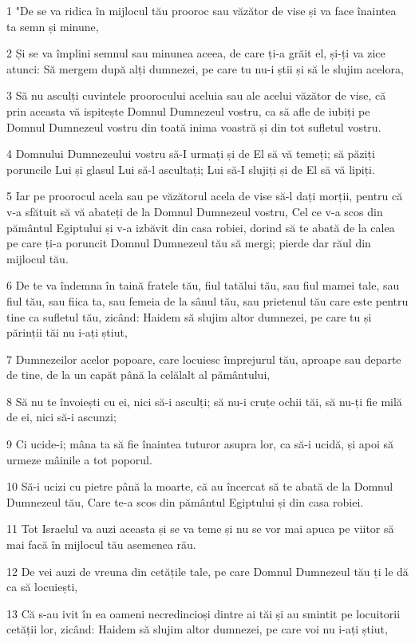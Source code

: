 \par 1 "De se va ridica în mijlocul tău prooroc sau văzător de vise și va face înaintea ta semn și minune,
\par 2 Și se va împlini semnul sau minunea aceea, de care ți-a grăit el, și-ți va zice atunci: Să mergem după alți dumnezei, pe care tu nu-i știi și să le slujim acelora,
\par 3 Să nu asculți cuvintele proorocului aceluia sau ale acelui văzător de vise, că prin aceasta vă ispitește Domnul Dumnezeul vostru, ca să afle de iubiți pe Domnul Dumnezeul vostru din toată inima voastră și din tot sufletul vostru.
\par 4 Domnului Dumnezeului vostru să-I urmați și de El să vă temeți; să păziți poruncile Lui și glasul Lui să-l ascultați; Lui să-I slujiți și de El să vă lipiți.
\par 5 Iar pe proorocul acela sau pe văzătorul acela de vise să-l dați morții, pentru că v-a sfătuit să vă abateți de la Domnul Dumnezeul vostru, Cel ce v-a scos din pământul Egiptului și v-a izbăvit din casa robiei, dorind să te abată de la calea pe care ți-a poruncit Domnul Dumnezeul tău să mergi; pierde dar răul din mijlocul tău.
\par 6 De te va îndemna în taină fratele tău, fiul tatălui tău, sau fiul mamei tale, sau fiul tău, sau fiica ta, sau femeia de la sânul tău, sau prietenul tău care este pentru tine ca sufletul tău, zicând: Haidem să slujim altor dumnezei, pe care tu și părinții tăi nu i-ați știut,
\par 7 Dumnezeilor acelor popoare, care locuiesc împrejurul tău, aproape sau departe de tine, de la un capăt până la celălalt al pământului,
\par 8 Să nu te învoiești cu ei, nici să-i asculți; să nu-i cruțe ochii tăi, să nu-ți fie milă de ei, nici să-i ascunzi;
\par 9 Ci ucide-i; mâna ta să fie înaintea tuturor asupra lor, ca să-i ucidă, și apoi să urmeze mâinile a tot poporul.
\par 10 Să-i ucizi cu pietre până la moarte, că au încercat să te abată de la Domnul Dumnezeul tău, Care te-a scos din pământul Egiptului și din casa robiei.
\par 11 Tot Israelul va auzi aceasta și se va teme și nu se vor mai apuca pe viitor să mai facă în mijlocul tău asemenea rău.
\par 12 De vei auzi de vreuna din cetățile tale, pe care Domnul Dumnezeul tău ți le dă ca să locuiești,
\par 13 Că s-au ivit în ea oameni necredincioși dintre ai tăi și au smintit pe locuitorii cetății lor, zicând: Haidem să slujim altor dumnezei, pe care voi nu i-ați știut,

